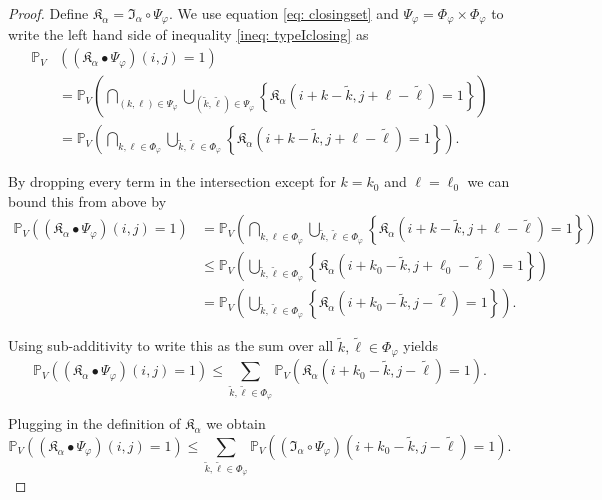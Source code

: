 \documentclass[a4paper,12pt]{article}
\theoremstyle{plain}
\theoremstyle{definition}
\begin{document}
\begin{proof}
	Define $\mathfrak{K}_\alpha = \mathfrak{I}_\alpha \circ \Psi_\varphi$. We use equation \eqref{eq: closingset} and $\Psi_\varphi = \Phi_\varphi \times \Phi_\varphi$ to write the left hand side of inequality \eqref{ineq: typeIclosing} as
	\begin{align*}
		\mathbb{P}_V&\left( (\mathfrak{K}_\alpha \bullet \Psi_\varphi)(i, j) = 1 \right) \\
		&= \mathbb{P}_V\left( \bigcap_{(k, \ell) \in \Psi_\varphi} \bigcup_{(\tilde{k}, \tilde{\ell}) \in \Psi_\varphi} \left\{ \mathfrak{K}_\alpha(i + k - \tilde{k}, j + \ell - \tilde{\ell}) = 1 \right\} \right) \\
		&= \mathbb{P}_V\left( \bigcap_{k, \ell \in \Phi_\varphi} \bigcup_{\tilde{k}, \tilde{\ell} \in \Phi_\varphi} \left\{ \mathfrak{K}_\alpha(i + k - \tilde{k}, j + \ell - \tilde{\ell}) = 1 \right\} \right).
	\end{align*}
	
	By dropping every term in the intersection except for $k = k_0$ and $\ell = \ell_0$ we can bound this from above by
	\begin{align*}
		\mathbb{P}_V\left( (\mathfrak{K}_\alpha \bullet \Psi_\varphi)(i, j) = 1 \right) &= \mathbb{P}_V\left( \bigcap_{k, \ell \in \Phi_\varphi} \bigcup_{\tilde{k}, \tilde{\ell} \in \Phi_\varphi} \left\{ \mathfrak{K}_\alpha(i + k - \tilde{k}, j + \ell - \tilde{\ell}) = 1 \right\} \right) \\
		&\leq \mathbb{P}_V\left( \bigcup_{\tilde{k}, \tilde{\ell} \in \Phi_\varphi} \left\{ \mathfrak{K}_\alpha(i + k_0 - \tilde{k}, j + \ell_0 - \tilde{\ell}) = 1 \right\} \right) \\
		&= \mathbb{P}_V\left( \bigcup_{\tilde{k}, \tilde{\ell} \in \Phi_\varphi} \left\{ \mathfrak{K}_\alpha(i + k_0 - \tilde{k}, j - \tilde{\ell}) = 1 \right\} \right).
	\end{align*}
	
	Using sub-additivity to write this as the sum over all $\tilde{k}, \tilde{\ell} \in \Phi_\varphi$ yields
	\begin{equation*}
		\mathbb{P}_V\left( (\mathfrak{K}_\alpha \bullet \Psi_\varphi)(i, j) = 1 \right) \leq \sum_{\tilde{k}, \tilde{\ell} \in \Phi_\varphi} \mathbb{P}_V\left( \mathfrak{K}_\alpha(i + k_0 - \tilde{k}, j - \tilde{\ell}) = 1 \right).
	\end{equation*}
	
	Plugging in the definition of $\mathfrak{K}_\alpha$ we obtain
	\begin{equation*}
		\mathbb{P}_V\left( (\mathfrak{K}_\alpha \bullet \Psi_\varphi)(i, j) = 1 \right) \leq \sum_{\tilde{k}, \tilde{\ell} \in \Phi_\varphi} \mathbb{P}_V\left( (\mathfrak{I}_\alpha \circ \Psi_\varphi)(i + k_0 - \tilde{k}, j - \tilde{\ell}) = 1 \right).
	\end{equation*}
	

\end{proof}
\end{document}
